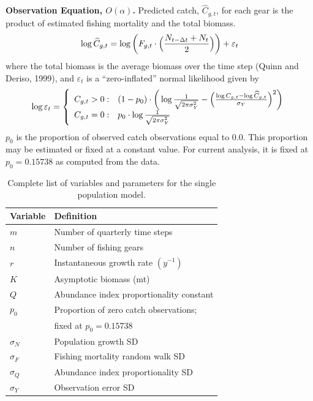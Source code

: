 \documentclass[12pt,letterpaper,twoside]{article}
\begin{document}
{\bf Observation Equation, $O(\alpha)$.}
Predicted catch, $\widehat{C}_{g,t}$, for each gear is the product of
estimated fishing mortality and the total biomass.
\begin{equation}
\log \widehat{C}_{g,t} = \log\bigg(F_{g,t}\cdot\Bigl(\frac{N_{t-\Delta
t}+N_t}{2}\Bigr)\bigg) + \varepsilon_t
\label{eqn:obs1}
\end{equation}
where the total biomass is  the average
biomass over the time step (Quinn and Deriso, 1999), and
$\varepsilon_t$ is a ``zero-inflated'' normal likelihood given by
\begin{equation}
  \log \varepsilon_t = \left\{
    \begin{array}{r@{\;:\quad}l}
       C_{g,t} > 0 &
(1-p_0)\cdot\bigg(\log\frac{1}{\sqrt{2\pi\sigma^2_Y}}
          -\Bigl(\frac{\log
C_{g,t}-\log\widehat{C}_{g,t}}{\sigma_Y}\Bigr)^2\bigg)\\
       C_{g,t} = 0 & p_0 \cdot\log \frac{1}{\sqrt{2\pi\sigma^2_Y}}\\
    \end{array}
  \right.
\end{equation}
$p_0$ is the proportion of observed catch observations equal to 0.0.
This proportion may be estimated or fixed at a constant value. For
current analysis, it is fixed at $p_0 = 0.15738$ as computed from the data.



\begin{table}
\caption{Complete list of variables and parameters for the single
population model.
\label{tab:allvars1}}
\begin{center}
\begin{tabular}{ll}
\hline
Variable & Definition\\
\hline
\hline
$m$ & Number of quarterly time steps\\
$n$ & Number of fishing gears\\
\hline
\hline
$r$ & Instantaneous growth rate $(y^{-1})$\\
$K$ & Asymptotic biomass (mt) \\
$Q$ & Abundance index proportionality constant\\
$p_0$ & Proportion of zero catch observations;\\
      & fixed at $p_0 = 0.15738$\\
\hline
$\sigma_N$ & Population growth SD\\
$\sigma_F$ & Fishing mortality random walk SD\\
$\sigma_Q$ & Abundance index proportionality SD\\
$\sigma_Y$ & Observation error SD \\
\hline
\end{tabular}
\end{center}
\end{table}
\clearpage

\end{document}
